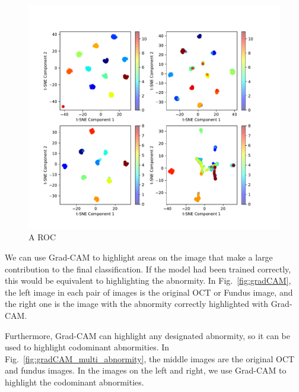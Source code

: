 \documentclass{article}
\begin{document}
	\begin{figure}[htbp]
		\centering
		\includegraphics[width=\linewidth]{Figs/abnormity_tSNE.pdf}
		\caption{A ROC}
		\vspace{0.3cm}
		\label{fig:A_tSNE}
	\end{figure}
	
	\vspace{0.3cm}
	
	We can use Grad-CAM \autocite{Selvaraju_Cogswell_Das_Vedantam_Parikh_Batra} to highlight areas on the image that make a large contribution to the final classification. If the model had been trained correctly, this would be equivalent to highlighting the abnormity. In Fig.~\ref{fig:gradCAM}, the left image in each pair of images is the original OCT or Fundus image, and the right one is the image with the abnormity correctly highlighted with Grad-CAM. 
	
	Furthermore, Grad-CAM can highlight any designated abnormity, so it can be used to highlight codominant abnormities. In Fig.~\ref{fig:gradCAM_multi_abnormity}, the middle images are the original OCT and fundus images. In the images on the left and right, we use Grad-CAM to highlight the codominant abnormities.
	
\end{document}
